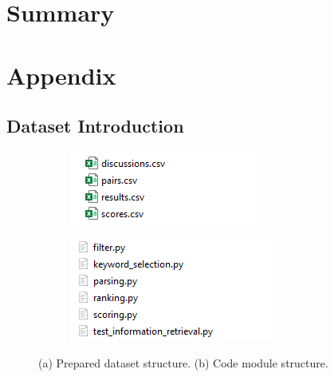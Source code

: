 \documentclass[10pt,a4paper,fleqn]{report}
\begin{document}
			
			
			
			
		
\chapter{Summary}

\chapter{Appendix} \label{sk: dataandcode}
	

	\section{Dataset Introduction} 	
	
	\begin{figure}[htbp]
		\centering
		\begin{subfigure}[b]{0.48\textwidth}
			\centering
			\includegraphics[width=\textwidth]{figure/dataset_structure}
			\caption{}
			\label{fig: datasetstructure}
		\end{subfigure}
		\hfill
		\begin{subfigure}[b]{0.48\textwidth}
			\centering
			\includegraphics[width=\textwidth]{figure/code_structure}
			\caption{}
			\label{fig: codestructure}
		\end{subfigure}
		\hfill
		\caption[]{(a) Prepared dataset structure. (b) Code module structure.}
		\label{fig: structures}
	\end{figure}
	
\end{document}
